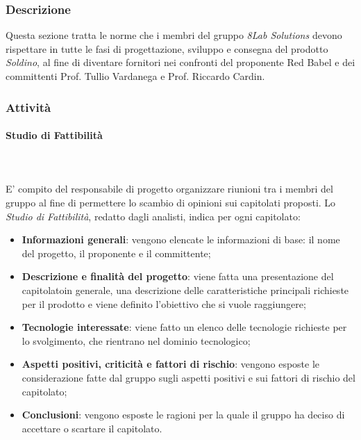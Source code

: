 	\subsubsection{Descrizione}
	Questa sezione tratta le norme che i membri del gruppo \textit{8Lab Solutions} devono rispettare in tutte le fasi di progettazione, sviluppo e consegna del prodotto \textit{Soldino}, al fine di diventare fornitori nei confronti del proponente Red Babel e dei committenti Prof. Tullio Vardanega e Prof. Riccardo Cardin.
	\subsubsection{Attività}
		\paragraph{Studio di Fattibilità} \mbox{}\\ \mbox{}\\
		E' compito del responsabile di progetto organizzare riunioni tra i membri del gruppo al fine di permettere lo scambio di opinioni sui capitolati proposti.
		Lo \textit{Studio di Fattibilità}, redatto dagli analisti, indica per ogni capitolato\glo:
		\begin{itemize}
			\item \textbf{Informazioni generali}: vengono elencate le informazioni di base: il nome del progetto, il proponente e il committente;
			\item \textbf{Descrizione e finalità del progetto}: viene fatta una presentazione del capitolato\glosp in generale, una descrizione delle caratteristiche principali richieste per il prodotto e viene definito l'obiettivo che si vuole raggiungere;
			\item \textbf{Tecnologie interessate}: viene fatto un elenco delle tecnologie richieste per lo svolgimento, che rientrano nel dominio tecnologico;
			\item \textbf{Aspetti positivi, criticità e fattori di rischio}: vengono esposte le considerazione fatte dal gruppo sugli aspetti positivi e sui fattori di rischio del capitolato\glo;
			\item \textbf{Conclusioni}: vengono esposte le ragioni per la quale il gruppo ha deciso di accettare o scartare il capitolato\glo.
		\end{itemize}
